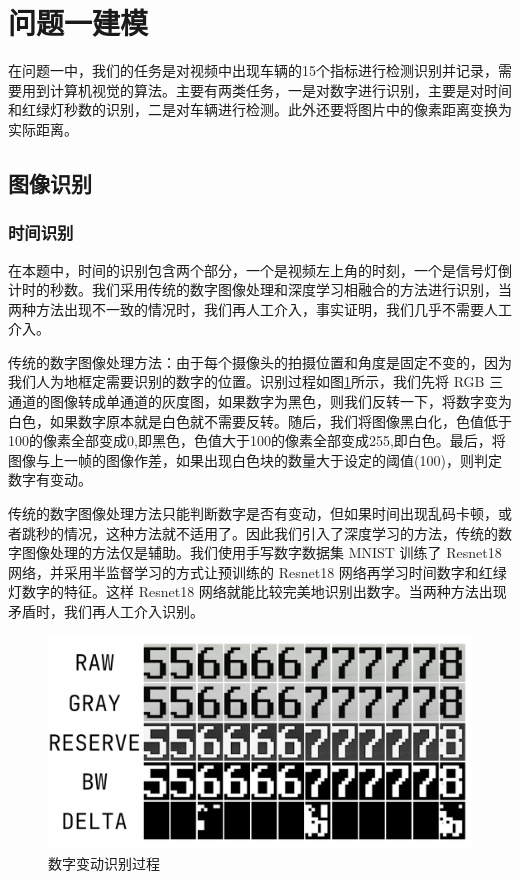 \section{问题一建模}

在问题一中，我们的任务是对视频中出现车辆的15个指标进行检测识别并记录，需要用到计算机视觉的算法。主要有两类任务，一是对数字进行识别，主要是对时间和红绿灯秒数的识别，二是对车辆进行检测。此外还要将图片中的像素距离变换为实际距离。

\subsection{图像识别}

\subsubsection{时间识别}

在本题中，时间的识别包含两个部分，一个是视频左上角的时刻，一个是信号灯倒计时的秒数。我们采用传统的数字图像处理和深度学习相融合的方法进行识别，当两种方法出现不一致的情况时，我们再人工介入，事实证明，我们几乎不需要人工介入。

传统的数字图像处理方法：由于每个摄像头的拍摄位置和角度是固定不变的，因为我们人为地框定需要识别的数字的位置。识别过程如图\ref{fig:digits}所示，我们先将 RGB 三通道的图像转成单通道的灰度图，如果数字为黑色，则我们反转一下，将数字变为白色，如果数字原本就是白色就不需要反转。随后，我们将图像黑白化，色值低于100的像素全部变成0,即黑色，色值大于100的像素全部变成255,即白色。最后，将图像与上一帧的图像作差，如果出现白色块的数量大于设定的阈值(100)，则判定数字有变动。

传统的数字图像处理方法只能判断数字是否有变动，但如果时间出现乱码卡顿，或者跳秒的情况，这种方法就不适用了。因此我们引入了深度学习的方法，传统的数字图像处理的方法仅是辅助。我们使用手写数字数据集 MNIST 训练了 Resnet18 网络，并采用半监督学习的方式让预训练的 Resnet18 网络再学习时间数字和红绿灯数字的特征。这样 Resnet18 网络就能比较完美地识别出数字。当两种方法出现矛盾时，我们再人工介入识别。

\begin{figure}[h]
    \centering
    \includegraphics[scale=0.5]{figures/digits}
    \caption{数字变动识别过程}
    \label{fig:digits}
\end{figure}

